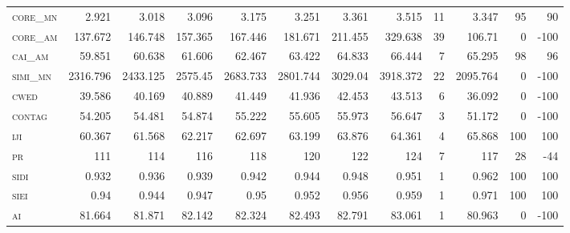 \begin{landscape}
\begin{table}[!htbp]
\begin{tabular}{@{}lrrrrrrrr|rrr@{}}
\textsc{core\_mn  } & 2.921    & 3.018    & 3.096    & 3.175    & 3.251    & 3.361    & 3.515     & 11     & 3.347         & 95             & 90              \\
\textsc{core\_am  } & 137.672  & 146.748  & 157.365  & 167.446  & 181.671  & 211.455  & 329.638   & 39     & 106.71        & 0              & -100            \\
\textsc{cai\_am   } & 59.851   & 60.638   & 61.606   & 62.467   & 63.422   & 64.833   & 66.444    & 7      & 65.295        & 98             & 96              \\
\textsc{simi\_mn  } & 2316.796 & 2433.125 & 2575.45  & 2683.733 & 2801.744 & 3029.04  & 3918.372  & 22     & 2095.764      & 0              & -100            \\
\textsc{cwed      } & 39.586   & 40.169   & 40.889   & 41.449   & 41.936   & 42.453   & 43.513    & 6      & 36.092        & 0              & -100            \\
\textsc{contag    } & 54.205   & 54.481   & 54.874   & 55.222   & 55.605   & 55.973   & 56.647    & 3      & 51.172        & 0              & -100            \\
\textsc{iji       } & 60.367   & 61.568   & 62.217   & 62.697   & 63.199   & 63.876   & 64.361    & 4      & 65.868        & 100            & 100             \\
\textsc{pr        } & 111      & 114      & 116      & 118      & 120      & 122      & 124       & 7      & 117           & 28             & -44             \\
\textsc{sidi      } & 0.932    & 0.936    & 0.939    & 0.942    & 0.944    & 0.948    & 0.951     & 1      & 0.962         & 100            & 100             \\
\textsc{siei      } & 0.94     & 0.944    & 0.947    & 0.95     & 0.952    & 0.956    & 0.959     & 1      & 0.971         & 100            & 100             \\
\textsc{ai        } & 81.664   & 81.871   & 82.142   & 82.324   & 82.493   & 82.791   & 83.061    & 1      & 80.963        & 0              & -100            \\ \bottomrule
\end{tabular}
\end{table}
\end{landscape}


